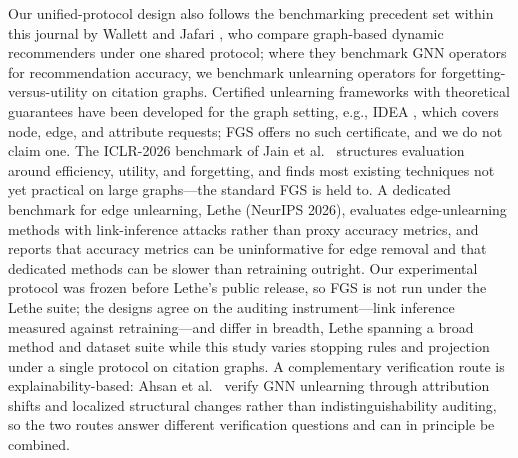 \documentclass[pdflatex,sn-basic,Numbered]{sn-jnl}
\begin{document}
Our unified-protocol design also follows the benchmarking precedent set within this journal by Wallett and Jafari \cite{wallett2024}, who compare graph-based dynamic recommenders under one shared protocol; where they benchmark GNN operators for recommendation accuracy, we benchmark unlearning operators for forgetting-versus-utility on citation graphs. Certified unlearning frameworks with theoretical guarantees have been developed for the graph setting, e.g., IDEA \cite{idea2024}, which covers node, edge, and attribute requests; FGS offers no such certificate, and we do not claim one. The ICLR-2026 benchmark of Jain et al.\ \cite{jain2026} structures evaluation around efficiency, utility, and forgetting, and finds most existing techniques not yet practical on large graphs---the standard FGS is held to. A dedicated benchmark for edge unlearning, Lethe \cite{lethe2026} (NeurIPS 2026), evaluates edge-unlearning methods with link-inference attacks rather than proxy accuracy metrics, and reports that accuracy metrics can be uninformative for edge removal and that dedicated methods can be slower than retraining outright. Our experimental protocol was frozen before Lethe's public release, so FGS is not run under the Lethe suite; the designs agree on the auditing instrument---link inference measured against retraining---and differ in breadth, Lethe spanning a broad method and dataset suite while this study varies stopping rules and projection under a single protocol on citation graphs. A complementary verification route is explainability-based: Ahsan et al.\ \cite{ahsan2026} verify GNN unlearning through attribution shifts and localized structural changes rather than indistinguishability auditing, so the two routes answer different verification questions and can in principle be combined.
\end{document}
